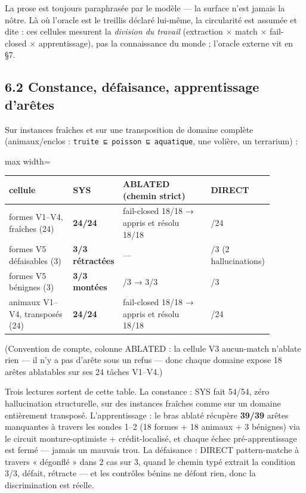 \documentclass[11pt]{article}
\begin{document}
La prose est toujours paraphrasée par le modèle — la surface n'est jamais la nôtre. Là où l'oracle est le treillis déclaré lui-même, la circularité est assumée et dite : ces cellules mesurent la \emph{division du travail} (extraction × match × fail-closed × apprentissage), pas la connaissance du monde ; l'oracle externe vit en §7.

\subsection*{6.2 Constance, défaisance, apprentissage d'arêtes}

Sur instances fraîches et sur une transposition de domaine complète (animaux/enclos : \texttt{truite ⊑ poisson ⊑ aquatique}, une volière, un terrarium) :

\begin{center}\small\begin{adjustbox}{max width=\linewidth}\begin{tabular}{>{\raggedright\arraybackslash}p{0.242\linewidth}>{\raggedright\arraybackslash}p{0.121\linewidth}>{\raggedright\arraybackslash}p{0.332\linewidth}>{\raggedright\arraybackslash}p{0.181\linewidth}}\toprule
cellule & SYS & ABLATED (chemin strict) & DIRECT \\ \midrule
formes V1–V4, fraîches (24) & \textbf{24/24} & fail-closed 18/18 → appris et résolu 18/18 & 20/24 \\
formes V5 défaisables (3) & \textbf{3/3 rétractées} & — & 1/3 (2 hallucinations) \\
formes V5 bénignes (3) & \textbf{3/3 montées} & 3/3 → 3/3 & 3/3 \\
animaux V1–V4, transposés (24) & \textbf{24/24} & fail-closed 18/18 → appris et résolu 18/18 & 16/24 \\
\bottomrule\end{tabular}\end{adjustbox}\end{center}

(Convention de compte, colonne ABLATED : la cellule V3 aucun-match n'ablate rien — il n'y a pas d'arête sous un refus — donc chaque domaine expose 18 arêtes ablatables sur ses 24 tâches V1–V4.)

Trois lectures sortent de cette table. La constance : SYS fait 54/54, zéro hallucination structurelle, sur des instances fraîches comme sur un domaine entièrement transposé. L'apprentissage : le bras ablaté récupère \textbf{39/39} arêtes manquantes à travers les sondes 1–2 (18 formes + 18 animaux + 3 bénignes) via le circuit monture-optimiste + crédit-localisé, et chaque échec pré-apprentissage est fermé — jamais un mauvais trou. La défaisance : DIRECT pattern-matche à travers « dégonflé » dans 2 cas sur 3, quand le chemin typé extrait la condition 3/3, défait, rétracte — et les contrôles bénins ne défont rien, donc la discrimination est réelle.
\end{document}
